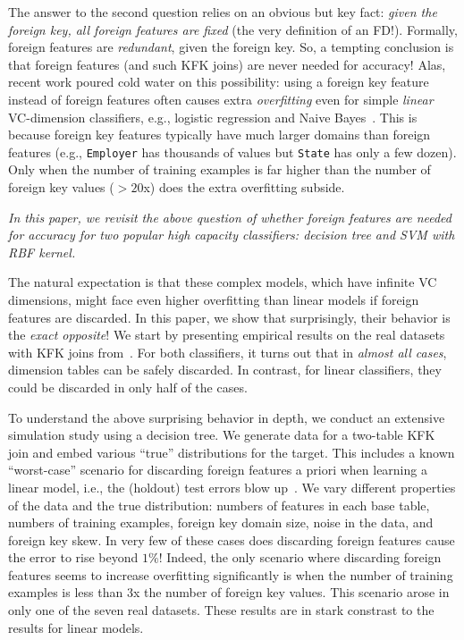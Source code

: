 The answer to the second question relies on an obvious but key fact: \textit{given the foreign key, all foreign features are fixed} (the very definition of an FD!).
Formally, foreign features are \textit{redundant}, given the foreign key. 
So, a tempting conclusion is that foreign features (and such KFK joins) are never needed for accuracy! Alas, recent work poured cold water
on this possibility: using a foreign key feature instead of foreign features often causes extra \textit{overfitting} even for simple \textit{linear} VC-dimension classifiers,
e.g., logistic regression and Naive Bayes~\cite{hamlet}. This is because foreign key features typically have much larger domains than foreign features (e.g., 
\texttt{Employer} has thousands of values but \texttt{State} has only a few dozen). 
Only when the number of training examples is far higher than the number of foreign key values ($>20$x) does the extra overfitting subside.

\textit{In this paper, we revisit the above question of whether foreign features are needed for accuracy for two popular \textit{high capacity} classifiers: 
decision tree and SVM with RBF kernel.}

The natural expectation is that these complex models, which have infinite VC dimensions, might face even higher overfitting than linear models if foreign features are 
discarded. In this paper, we show that surprisingly, their behavior is the \textit{exact opposite}! We start by presenting empirical results 
on the real datasets with KFK joins from~\cite{hamlet}. For both classifiers, it turns out that in \textit{almost all cases}, dimension tables can be safely 
discarded. In contrast, for linear classifiers, they could be discarded in only half of the cases.

To understand the above surprising behavior in depth, we conduct an extensive simulation study using a decision tree. We generate data for a two-table KFK join 
and embed various ``true'' distributions for the target. This includes a known ``worst-case'' scenario for discarding foreign features a priori when learning a linear model, 
i.e., the (holdout) test errors blow up~\cite{hamlet}. We vary different properties of the data and the true distribution: 
numbers of features in each base table, numbers of training examples, foreign key domain size, noise in the data, and foreign key skew. 
In very few of these cases does discarding foreign features cause the error to rise beyond $1\%$! Indeed, the only scenario where discarding foreign features seems to increase 
overfitting significantly is when the number of training examples is less than $3$x the number of foreign key values. This scenario arose in only one of the seven real datasets.
These results are in stark constrast to the results for linear models.


